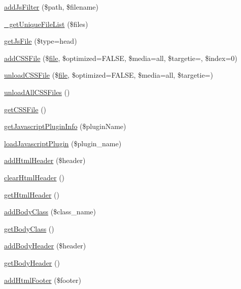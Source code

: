 \begin{DoxyCompactItemize}
\item 
\hyperlink{classContext_ae93f59a2ffac5a3074acd304d10ad7b3}{add\+Js\+Filter} (\$path, \$filename)
\item 
\hyperlink{classContext_a8bde0f7d77424555f9b856664b59e0bc}{\+\_\+get\+Unique\+File\+List} (\$files)
\item 
\hyperlink{classContext_a9989fb9f7be0a978df65e50462460317}{get\+Js\+File} (\$type=\textquotesingle{}head\textquotesingle{})
\item 
\hyperlink{classContext_a21516d16d7f4a6603ab89e6e75a233ca}{add\+C\+S\+S\+File} (\$\hyperlink{classfile}{file}, \$optimized=F\+A\+L\+SE, \$media=\textquotesingle{}all\textquotesingle{}, \$targetie=\textquotesingle{}\textquotesingle{}, \$index=0)
\item 
\hyperlink{classContext_a26b1057bf312eeda0fbfcb28256c406c}{unload\+C\+S\+S\+File} (\$\hyperlink{classfile}{file}, \$optimized=F\+A\+L\+SE, \$media=\textquotesingle{}all\textquotesingle{}, \$targetie=\textquotesingle{}\textquotesingle{})
\item 
\hyperlink{classContext_a9eb05677aeb2e95029a10919ffc6053f}{unload\+All\+C\+S\+S\+Files} ()
\item 
\hyperlink{classContext_a1b14cb135e24cc9c79414a50575cf309}{get\+C\+S\+S\+File} ()
\item 
\hyperlink{classContext_abf616bb3259e090c6e85b3aa1b581b60}{get\+Javascript\+Plugin\+Info} (\$plugin\+Name)
\item 
\hyperlink{classContext_acaea76bdc1334df9c2f088103d619593}{load\+Javascript\+Plugin} (\$plugin\+\_\+name)
\item 
\hyperlink{classContext_a26a1aea944ae54bb826500f544a67950}{add\+Html\+Header} (\$header)
\item 
\hyperlink{classContext_a5f0332b30b4ad65c0374ebd848c1dd98}{clear\+Html\+Header} ()
\item 
\hyperlink{classContext_a302e4b5d868e7a5c8bee216f774ca244}{get\+Html\+Header} ()
\item 
\hyperlink{classContext_ad266c6556167746e9368c4b1a7f6b16b}{add\+Body\+Class} (\$class\+\_\+name)
\item 
\hyperlink{classContext_a6562a2a894b2142362640e512bcf4e09}{get\+Body\+Class} ()
\item 
\hyperlink{classContext_ae7c9dad9ccd3e410283e21c67f395114}{add\+Body\+Header} (\$header)
\item 
\hyperlink{classContext_a991c9fc6985b78d817b6771092913975}{get\+Body\+Header} ()
\item 
\hyperlink{classContext_aa81925b1cc7e991c1c798e739fe048a4}{add\+Html\+Footer} (\$footer)

\end{DoxyCompactItemize}

